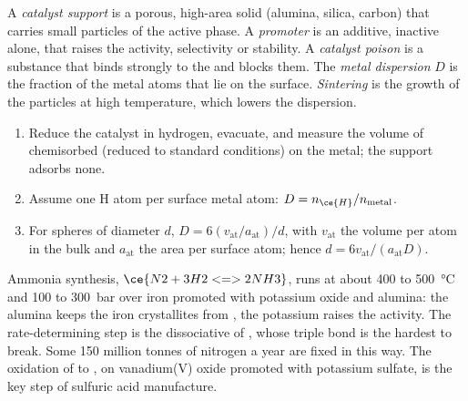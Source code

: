 \begin{definition}\label{def:b3:surfaces-catalysis:catalyst-design}
A \emph{catalyst support} is a porous, high-area solid
(alumina, silica, carbon) that carries small particles of the active phase. A
\emph{promoter} is an additive, inactive alone, that raises the
activity, selectivity or stability. A \emph{catalyst poison} is a substance that binds strongly to the  and blocks them.
The \emph{metal dispersion} $D$ is the fraction of the metal
atoms that lie on the surface. \emph{Sintering} is the growth of
the particles at high temperature, which lowers the dispersion.
\end{definition}

\begin{method}\label{met:b3:surfaces-catalysis:dispersion}
\begin{enumerate}
  \item Reduce the catalyst in hydrogen, evacuate, and measure the volume of 
        chemisorbed (reduced to standard conditions) on the metal; the
        support adsorbs none.
  \item Assume one H atom per surface metal atom: $D = n_{\ce{H}}/n_{\text{metal}}$.
  \item For spheres of diameter $d$, $D = 6(v_{\mathrm{at}}/a_{\mathrm{at}})/d$, with $v_{\mathrm{at}}$ the volume per atom in the
        bulk and $a_{\mathrm{at}}$ the area per surface atom; hence $d = 6v_{\mathrm{at}}/(a_{\mathrm{at}}D)$.
\end{enumerate}
\end{method}

Ammonia synthesis, $\ce{N2 + 3 H2 <=> 2 NH3}$, runs at about 400 to \qty{500}{\celsius} and 100 to
\qty{300}{bar} over iron promoted with potassium oxide and alumina: the alumina keeps
the iron crystallites from , the potassium raises the activity. The
rate-determining step is the dissociative  of , whose triple
bond is the hardest to break. Some 150 million tonnes of nitrogen a year are
fixed in this way.
The oxidation of  to , on vanadium(V) oxide promoted
with potassium sulfate, is the key step of sulfuric acid manufacture.

